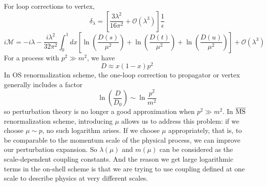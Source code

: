 For loop corrections to vertex,
\[\delta_{\lambda} = \left[\frac{3\lambda^2}{16\pi^2} + \mathcal{O}(\lambda^3)\right]\frac{1}{\epsilon}\]
\[i\mathcal{M} = -i\lambda -\frac{i\lambda^2}{32\pi^2} \int_0^1 dx \left[\ln(\frac{D(s)}{\mu^2}) +\ln(\frac{D(t)}{\mu^2})+\ln(\frac{D(u)}{\mu^2})\right] + \mathcal{O}(\lambda^3)\]
For a process with $p^2 \gg m^2$, we have
\[ D \approx x(1-x)p^2\]
In OS renormalization scheme, the one-loop correction to propagator or vertex generally includes a factor
\[\ln \left( \frac{D}{D_0}\right ) \sim \ln \frac{p^2}{m^2}\]
so perturbation theory is no longer a good approximation when $p^2 \gg m^2$.
In $\overline{\rm MS}$ renormalization scheme, introducing $\mu$ allows us to address this problem: if we choose $\mu \sim p$, no such logarithm arises. If we choose $\mu$ appropriately, that is, to be comparable to the momentum scale of the physical process, we can
improve our perturbation expansion. 
So $\lambda(\mu)$ and $m(\mu)$ can be considered as the scale-dependent coupling constants.
And the reason we get large logarithmic terms in the on-shell scheme is that we are trying to use coupling defined at one scale to describe physics at very different scales.

